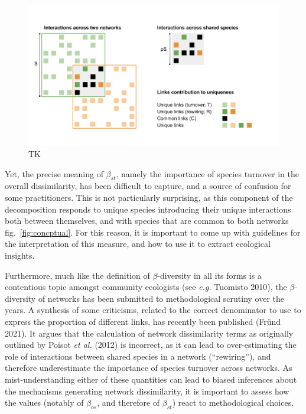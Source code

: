 \documentclass[10pt,oneside]{article}
\makeatletter
\def\maxwidth{\ifdim\Gin@nat@width>\linewidth\linewidth
\else\Gin@nat@width\fi}
\let\Oldincludegraphics\includegraphics
\renewcommand{\includegraphics}[1]{\Oldincludegraphics[width=\maxwidth]{#1}}
\makeatother
\begin{document}
\begin{figure}
\hypertarget{fig:conceptual}{%
\centering
\includegraphics{figures/betadiv_response_figure.png}
\caption{TK}\label{fig:conceptual}
}
\end{figure}

Yet, the precise meaning of \(\beta_{st}\), namely the importance of
species turnover in the overall dissimilarity, has been difficult to
capture, and a source of confusion for some practitioners. This is not
particularly surprising, as this component of the decomposition responds
to unique species introducing their unique interactions both between
themselves, and with species that are common to both networks
fig.~\ref{fig:concptual}. For this reason, it is important to come up
with guidelines for the interpretation of this measure, and how to use
it to extract ecological insights.

Furthermore, much like the definition of \(\beta\)-diversity in all its
forms is a contentious topic amongst community ecologists (see
\emph{e.g.} Tuomisto 2010), the \(\beta\)-diversity of networks has been
submitted to methodological scrutiny over the years. A synthesis of some
criticisms, related to the correct denominator to use to express the
proportion of different links, has recently been published (Fründ 2021).
It argues that the calculation of network dissimilarity terms as
originally outlined by Poisot \emph{et al.} (2012) is incorrect, as it
can lead to over-estimating the role of interactions between shared
species in a network (``rewiring''), and therefore underestimate the
importance of species turnover across networks. As mist-understanding
either of these quantities can lead to biased inferences about the
mechanisms generating network dissimilarity, it is important to assess
how the values (notably of \(\beta_{os}\), and therefore of
\(\beta_{st}\)) react to methodological choices.
\end{document}
